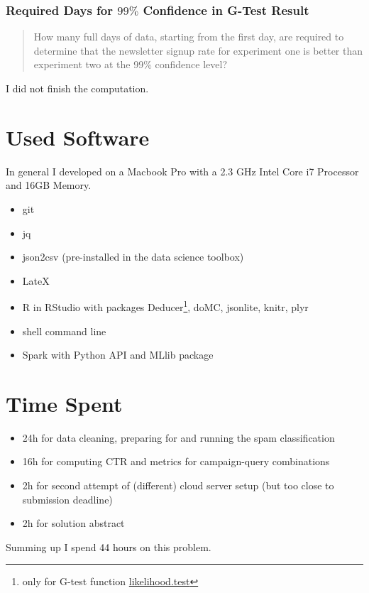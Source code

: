 \documentclass{article}\usepackage[]{graphicx}\usepackage[]{color}
\begin{document}
\subsubsection{Required Days for $99\%$ Confidence in G-Test Result} %
\label{subsub:days}

\begin{quote}
How many full days of data, starting from the first day, are required to determine that the newsletter signup rate for experiment one is better than experiment two at the 99\% confidence level?
\end{quote}

I did not finish the computation.





\section{Used Software}
\label{used_software}
In general I developed on a Macbook Pro with a 2.3 GHz Intel Core i7 Processor and 16GB Memory.

\begin{itemize}
	\item git
	\item jq
	\item json2csv (pre-installed in the data science toolbox)
	\item LateX
	\item R in RStudio with packages Deducer\footnote{only for G-test function \href{http://www.rforge.net/doc/packages/Deducer/likelihood.test.html}{likelihood.test}}, doMC, jsonlite, knitr, plyr 
	\item shell command line
	\item Spark with Python API and MLlib package
\end{itemize}

\section{Time Spent}
\begin{itemize}
	\item 24h for data cleaning, preparing for and running the spam classification
	\item 16h for computing CTR and metrics for campaign-query combinations
	\item 2h for second attempt of (different) cloud server setup (but too close to submission deadline)
	\item 2h for solution abstract
\end{itemize}

Summing up I spend \textcolor{black}{44 hours} on this problem.
\end{document}
